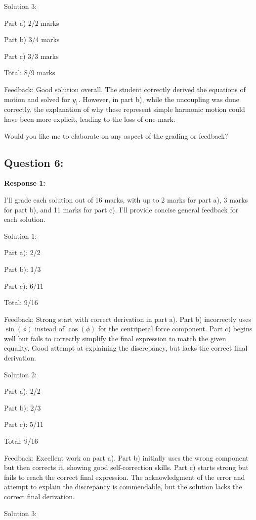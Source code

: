 \documentclass[a4paper,11pt]{article}
\begin{document}
Solution 3:

Part a) 2/2 marks

Part b) 3/4 marks

Part c) 3/3 marks

Total: 8/9 marks

Feedback: Good solution overall. The student correctly derived the equations of motion and solved for \(y_1\). However, in part b), while the uncoupling was done correctly, the explanation of why these represent simple harmonic motion could have been more explicit, leading to the loss of one mark.

Would you like me to elaborate on any aspect of the grading or feedback?


\subsection*{Question 6:}

\textbf{Response 1:}

I'll grade each solution out of 16 marks, with up to 2 marks for part a), 3 marks for part b), and 11 marks for part c). I'll provide concise general feedback for each solution.

Solution 1:

Part a): 2/2

Part b): 1/3

Part c): 6/11

Total: 9/16

Feedback: Strong start with correct derivation in part a). Part b) incorrectly uses \(\sin(\phi)\) instead of \(\cos(\phi)\) for the centripetal force component. Part c) begins well but fails to correctly simplify the final expression to match the given equality. Good attempt at explaining the discrepancy, but lacks the correct final derivation.

Solution 2:

Part a): 2/2

Part b): 2/3

Part c): 5/11

Total: 9/16

Feedback: Excellent work on part a). Part b) initially uses the wrong component but then corrects it, showing good self-correction skills. Part c) starts strong but fails to reach the correct final expression. The acknowledgment of the error and attempt to explain the discrepancy is commendable, but the solution lacks the correct final derivation.

Solution 3:
\end{document}
